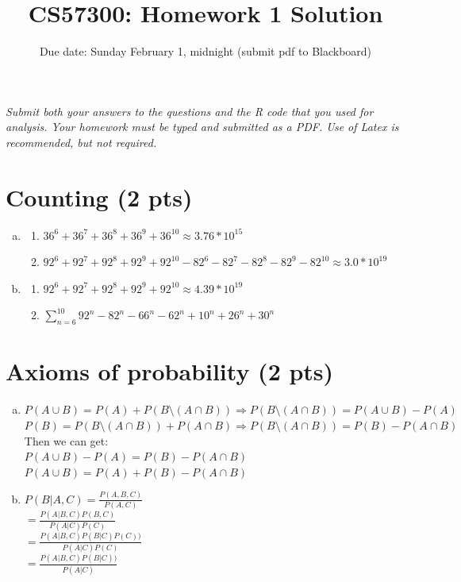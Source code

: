 \documentclass[11pt]{article}
\title{
\vspace{-20.mm}
CS57300: Homework 1 Solution}
\author{Due date: Sunday February 1, midnight (submit pdf to Blackboard)}
\date{}                                           %
\begin{document}
\maketitle

\vspace{-5.mm}
\noindent  \emph{Submit both your answers to the questions and the R code that you used for analysis. Your homework must be typed and submitted as a PDF. Use of Latex is recommended, but not required. }
\vspace{2.mm}


\section{Counting (2 pts)}


\begin{enumerate}[(a)]
	\item 
		\begin{enumerate}[(1)]
		\item $36^6 + 36^7 +36^8+36^9+36^{10} \approx 3.76 * 10^{15}$
		\item $92^6 + 92^7 +92^8+92^9+92^{10} - 82^6 - 82^7 -82^8 - 82^9-82^{10} \approx 3.0 * 10^{19}$
		\end{enumerate}
	
	\item 
		\begin{enumerate}[(1)]
		\item $92^6 + 92^7 +92^8+92^9+92^{10} \approx 4.39 * 10^{19}$
		\item $\sum_{n=6}^{10} 92^n -82^n-66^n-62^n+10^n+26^n+30^n$
		\end{enumerate}
\end{enumerate}

\section{Axioms of probability (2 pts)}

\begin{enumerate}[(a)]
  \item $P(A \cup B) = P(A) +P(B \setminus (A \cap B)) \Rightarrow P(B \setminus (A \cap B)) =  P(A \cup B) - P(A)$ 
  \\ $P(B) = P(B \setminus(A \cap B)) + P(A \cap B) \Rightarrow P(B \setminus (A \cap B)) = P(B) - P(A \cap B)$
  \\Then we can get:
  \\$P(A \cup B) - P(A) = P(B) - P(A \cap B)$
  \\$P(A \cup B) = P(A)+ P(B) - P(A \cap B)$
  	
  \item $P(B|A,C) = \frac{P(A,B,C)}{P(A,C)} $ \\ 
  		$= \frac{P(A|B,C)P(B,C)}{P(A|C)P(C)}  $  \\
  		$=\frac{P(A|B,C)P(B|C)P(C))}{P(A|C)P(C)}$\\
  		$= \frac{P(A|B,C)P(B|C))}{P(A|C)}$
\end{enumerate}
\end{document}
